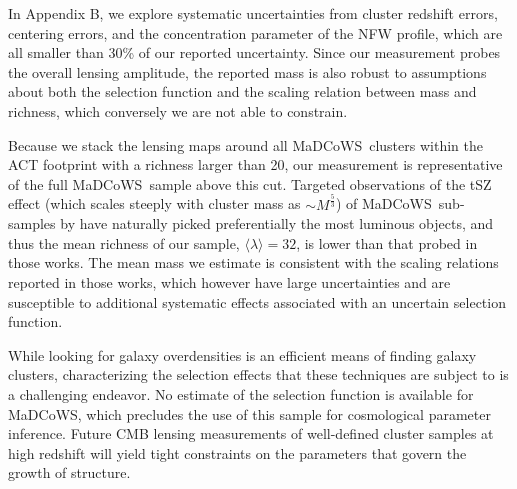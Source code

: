\documentclass[preprint2]{aastex63}
\newcommand{\madcows}{MaDCoWS}
\newcommand{\observable}{\lambda}
\begin{document}
In Appendix B, we explore systematic uncertainties from cluster redshift errors, centering errors, and the concentration parameter of the NFW profile, which are all smaller than 30\% of our reported uncertainty. Since our measurement probes the overall lensing amplitude, the reported mass is also robust to assumptions about both the selection function and the scaling relation between mass and richness, which conversely we are not able to constrain.

Because we stack the lensing maps around all \madcows\ clusters within the ACT footprint with a richness larger than 20, our measurement is representative of the full \madcows\ sample above this cut. Targeted observations of the tSZ effect (which scales steeply with cluster mass as $\sim M^{\frac{5}{3}}$) of \madcows\ sub-samples by \cite{gonzalez19,madcows_aca,madcows_mustang} have naturally picked preferentially the most luminous objects, and thus the mean richness of our sample, $\langle\observable\rangle=32$, is lower than that probed in those works. The mean mass we estimate is consistent with the scaling relations reported in those works, which however have large uncertainties and are susceptible to additional systematic effects associated with an uncertain selection function.

While looking for galaxy overdensities is an efficient means of finding galaxy clusters, characterizing the selection effects that these techniques are subject to is a challenging endeavor. No estimate of the selection function is available for \madcows, which precludes the use of this sample for cosmological parameter inference. Future CMB lensing measurements of well-defined cluster samples at high redshift will yield tight constraints on the parameters that govern the growth of structure. \\
\end{document}
